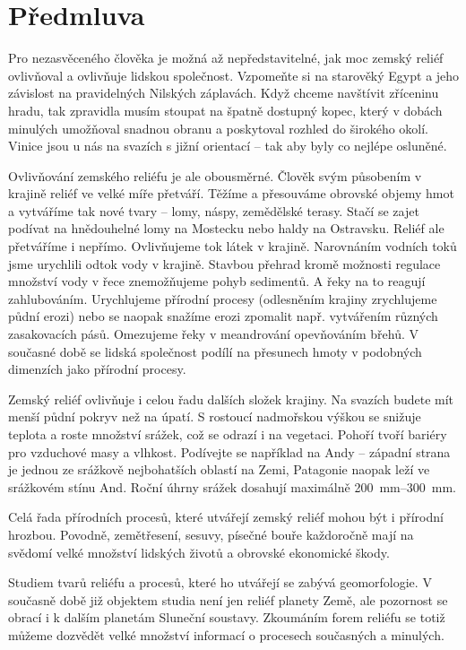 \chapter*{Předmluva}
Pro nezasvěceného člověka je možná až nepředstavitelné, jak moc zemský reliéf ovlivňoval a ovlivňuje lidskou společnost. Vzpomeňte si na starověký Egypt a jeho závislost na pravidelných Nilských záplavách. Když chceme navštívit zříceninu hradu, tak zpravidla musím stoupat na špatně dostupný kopec, který v dobách minulých umožňoval snadnou obranu a poskytoval rozhled do širokého okolí. Vinice jsou u nás na svazích s jižní orientací -- tak aby byly co nejlépe osluněné. 

Ovlivňování zemského reliéfu je ale obousměrné. Člověk svým působením v krajině reliéf ve velké míře přetváří. Těžíme a přesouváme obrovské objemy hmot a vytváříme tak nové tvary -- lomy, náspy, zemědělské terasy. Stačí se zajet podívat na hnědouhelné lomy na Mostecku nebo haldy na Ostravsku.  Reliéf ale přetváříme i nepřímo. Ovlivňujeme tok látek v krajině. Narovnáním vodních toků jsme urychlili odtok vody v krajině. Stavbou přehrad kromě možnosti regulace množství vody v řece znemožňujeme pohyb sedimentů. A řeky na to reagují zahlubováním. Urychlujeme přírodní procesy (odlesněním krajiny zrychlujeme půdní erozi) nebo se naopak snažíme erozi zpomalit např. vytvářením různých zasakovacích pásů. Omezujeme řeky v meandrování opevňováním břehů. V současné době se lidská společnost podílí na přesunech hmoty v podobných dimenzích jako přírodní procesy. 

Zemský reliéf ovlivňuje i celou řadu dalších složek krajiny. Na svazích budete mít menší půdní pokryv než na úpatí. S rostoucí nadmořskou výškou se snižuje teplota a roste množství srážek, což se odrazí i na vegetaci. Pohoří tvoří bariéry pro vzduchové masy a vlhkost. Podívejte se například na Andy -- západní strana je jednou ze srážkově nejbohatších oblastí na Zemi, Patagonie naopak leží ve srážkovém stínu And. Roční úhrny srážek dosahují maximálně \qtyrange{200}{300}{\milli\metre}. 

Celá řada přírodních procesů, které utvářejí zemský reliéf mohou být i přírodní hrozbou. Povodně, zemětřesení, sesuvy, písečné bouře každoročně mají na svědomí velké množství lidských životů a obrovské ekonomické škody. 

Studiem tvarů reliéfu a procesů, které ho utvářejí se zabývá geomorfologie. V současně době již objektem studia není jen reliéf planety Země, ale pozornost se obrací i k dalším planetám Sluneční soustavy. Zkoumáním forem reliéfu se totiž můžeme dozvědět velké množství informací o procesech současných a minulých.  

